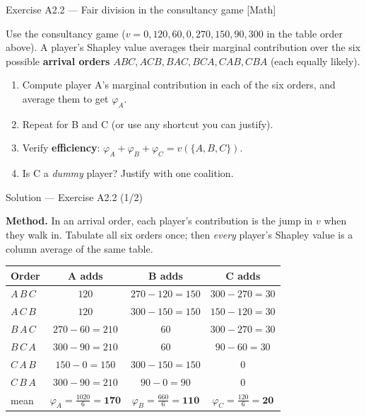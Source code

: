 \documentclass[aspectratio=169,11pt]{beamer}
\begin{document}
\begin{frame}{Exercise A2.2 --- Fair division in the consultancy game [Math]}
\begin{exercise}
  Use the consultancy game
  ($v = 0, 120, 60, 0, 270, 150, 90, 300$ in the table order above).
  A player's Shapley value averages their marginal contribution over the six
  possible \textbf{arrival orders} $ABC, ACB, BAC, BCA, CAB, CBA$ (each equally
  likely).
  \begin{enumerate}
    \item Compute player A's marginal contribution in each of the six orders,
          and average them to get $\varphi_A$.
    \item Repeat for B and C (or use any shortcut you can justify).
    \item Verify \textbf{efficiency}: $\varphi_A+\varphi_B+\varphi_C = v(\{A,B,C\})$.
    \item Is C a \emph{dummy} player? Justify with one coalition.
  \end{enumerate}
\end{exercise}
\end{frame}

\begin{frame}{Solution --- Exercise A2.2 (1/2)}
\begin{solutionbox}
  \textbf{Method.} In an arrival order, each player's contribution is the jump in
  $v$ when they walk in. Tabulate all six orders once; then \emph{every} player's
  Shapley value is a column average of the same table.
  \begin{center}
  \begin{tabular}{@{}lccc@{}}
    \toprule
    Order & A adds & B adds & C adds \\
    \midrule
    $A\,B\,C$ & $120$ & $270-120=150$ & $300-270=30$ \\
    $A\,C\,B$ & $120$ & $300-150=150$ & $150-120=30$ \\
    $B\,A\,C$ & $270-60=210$ & $60$ & $300-270=30$ \\
    $B\,C\,A$ & $300-90=210$ & $60$ & $90-60=30$ \\
    $C\,A\,B$ & $150-0=150$ & $300-150=150$ & $0$ \\
    $C\,B\,A$ & $300-90=210$ & $90-0=90$ & $0$ \\
    \midrule
    mean & $\varphi_A=\tfrac{1020}{6}=\mathbf{170}$ & $\varphi_B=\tfrac{660}{6}=\mathbf{110}$ & $\varphi_C=\tfrac{120}{6}=\mathbf{20}$ \\
    \bottomrule
  \end{tabular}
  \end{center}
\end{solutionbox}
\end{frame}
\end{document}
